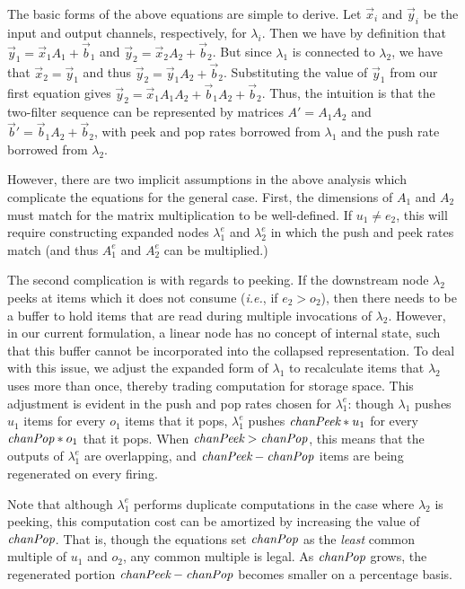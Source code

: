 {The basic forms of the above equations are simple to derive.  Let
${\vec x}_i$ and ${\vec y}_i$ be the input and output channels, respectively, for
$\lambda_i$.  Then we have by definition that ${\vec y}_1 = {\vec x}_1 A_1 + {\vec b}_1$
and ${\vec y}_2 = {\vec x}_2 A_2 + {\vec b}_2$.  But since $\lambda_1$ is connected to
$\lambda_2$, we have that ${\vec x}_2 = {\vec y}_1$ and thus 
${\vec y}_2 = {\vec y}_1 A_2 + {\vec b}_2$.
Substituting the value of ${\vec y}_1$ from our first equation gives ${\vec y}_2 =
{\vec x}_1 A_1 A_2 + {\vec b}_1 A_2 + {\vec b}_2$.  Thus, the intuition is that the
two-filter sequence can be represented by matrices $A' = A_1 A_2$
and ${\vec b}' = {\vec b}_1 A_2 + {\vec b}_2$, with peek and pop rates borrowed from
$\lambda_1$ and the push rate borrowed from $\lambda_2$.

However, there are two implicit assumptions in the above analysis
which complicate the equations for the general case.  First, the
dimensions of $A_1$ and $A_2$ must match for the matrix multiplication
to be well-defined.  If $u_1 \ne e_2$, this will require constructing
expanded nodes $\lambda_1^e$ and $\lambda_2^e$ in which the push and
peek rates match (and thus $A_1^e$ and $A_2^e$ can be multiplied.)

The second complication is with regards to peeking.  If the downstream
node $\lambda_2$ peeks at items which it does not consume ({\it i.e.},
if $e_2 > o_2$), then there needs to be a buffer to hold items that
are read during multiple invocations of $\lambda_2$.  However, in our
current formulation, a linear node has no concept of internal state,
such that this buffer cannot be incorporated into the collapsed
representation.  To deal with this issue, we adjust the expanded form
of $\lambda_1$ to recalculate items that $\lambda_2$ uses more than
once, thereby trading computation for storage space.  This adjustment
is evident in the push and pop rates chosen for $\lambda_1^e$: though
$\lambda_1$ pushes $u_1$ items for every $o_1$ items that it pops,
$\lambda_1^e$ pushes $\mbox{\it chanPeek}*u_1$ for every $\mbox{\it chanPop}*o_1$
that it pops.  When $\mbox{\it chanPeek}>\mbox{\it chanPop}$, this means that the
outputs of $\lambda_1^e$ are overlapping, and
$\mbox{\it chanPeek}-\mbox{\it chanPop}$ items are being regenerated on every
firing.

Note that although $\lambda_1^e$ performs duplicate computations in
the case where $\lambda_2$ is peeking, this computation cost can be
amortized by increasing the value of $\mbox{\it chanPop}$.  That is, though
the equations set $\mbox{\it chanPop}$ as the {\it least} common multiple of
$u_1$ and $o_2$, any common multiple is legal.  As $\mbox{\it chanPop}$
grows, the regenerated portion $\mbox{\it chanPeek}-\mbox{\it chanPop}$ becomes
smaller on a percentage basis.

}
